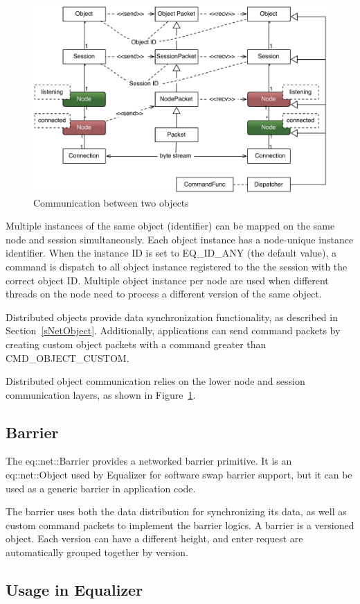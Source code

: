 \documentclass[10pt,a4]{scrartcl}
\newcommand{\fig}[1]{Figure~\ref{#1}}
\newcommand{\sref}[1]{Section~\ref{#1}}
\begin{document}
\begin{figure}
  \includegraphics[width=.618\textwidth]{images/netObject.pdf}
  {\caption{\small\label{fNetObject}Communication between two objects}}
\end{figure}
Multiple instances of the same object (identifier) can be mapped on the
same node and session simultaneously. Each object instance has a
node-unique instance identifier. When the instance ID is set to
\textsf{EQ\_ID\_ANY} (the default value), a command is dispatch to all
object instance registered to the the session with the correct object
ID. Multiple object instance per node are used when different threads on
the node need to process a different version of the same object.

Distributed objects provide data synchronization functionality, as
described in \sref{sNetObject}. Additionally, applications can send
command packets by creating custom object packets with a command greater
than \textsf{CMD\_OBJECT\_CUSTOM}.

Distributed object communication relies on the lower node and session
communication layers, as shown in \fig{fNetObject}.

\subsection{Barrier}

The \textsf{eq::net::Barrier} provides a networked barrier primitive. It
is an \textsf{eq::net::Object} used by Equalizer for software swap
barrier support, but it can be used as a generic barrier in application
code.

The barrier uses both the data distribution for synchronizing its data,
as well as custom command packets to implement the barrier logics. A
barrier is a versioned object. Each version can have a different height,
and enter request are automatically grouped together by version.


\subsection{\label{sNetUsage}Usage in Equalizer}
\end{document}
